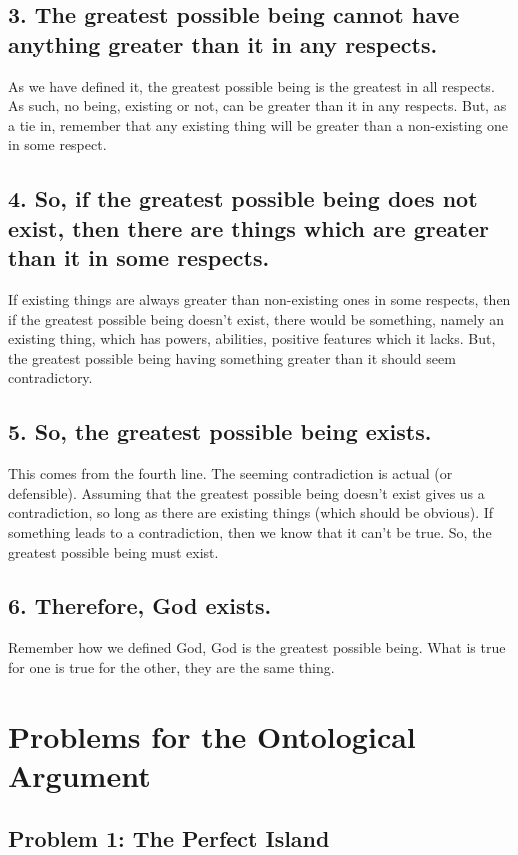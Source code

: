 \subsection{3. The greatest possible being cannot have anything greater than it in any respects.}

As we have defined it, the greatest possible being is the greatest in all respects. As such, no being, existing or not, can be greater than it in any respects. But, as a tie in, remember that any existing thing will be greater than a non-existing one in some respect.

\subsection{4. So, if the greatest possible being does not exist, then there are things which are greater than it in some respects.}

If existing things are always greater than non-existing ones in some respects, then if the greatest possible being doesn't exist, there would be something, namely an existing thing, which has powers, abilities, positive features which it lacks. But, the greatest possible being having something greater than it should seem contradictory. 

\subsection{5. So, the greatest possible being exists.}

This comes from the fourth line. The seeming contradiction is actual (or defensible). Assuming that the greatest possible being doesn't exist gives us a contradiction, so long as there are existing things (which should be obvious). If something leads to a contradiction, then we know that it can't be true. So, the greatest possible being must exist. 

\subsection{6. Therefore, God exists.}

Remember how we defined God, God is the greatest possible being. What is true for one is true for the other, they are the same thing.

\section{Problems for the Ontological Argument}
\subsection{Problem 1: The Perfect Island}

